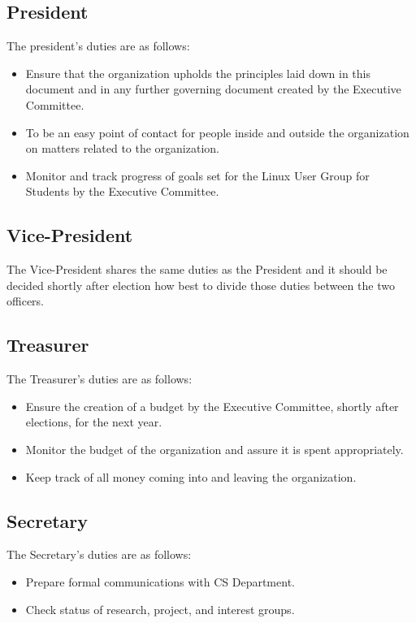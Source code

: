 \documentclass[letter]{report}
\begin{document}
\subsection{President}
The president's duties are as follows:
\begin{itemize}
	\item Ensure that the organization upholds the principles laid down in
	      this document and in any further governing document created by
	      the Executive Committee.
	\item To be an easy point of contact for people inside and outside the
	      organization on matters related to the organization.
	\item Monitor and track progress of goals set for the Linux User Group for Students
	      by the Executive Committee.
\end{itemize}

\subsection{Vice-President}
The Vice-President shares the same duties as the President and it should be
decided shortly after election how best to divide those duties between the two
officers.

\subsection{Treasurer}
The Treasurer's duties are as follows:
\begin{itemize}
	\item Ensure the creation of a budget by the Executive Committee,
	      shortly after elections, for the next year.
	\item Monitor the budget of the organization and assure it is spent
	      appropriately.
	\item Keep track of all money coming into and leaving the organization.
\end{itemize}

\subsection{Secretary}
The Secretary's duties are as follows:
\begin{itemize}
	\item Prepare formal communications with CS Department.
	\item Check status of research, project, and interest groups.
\end{itemize}
\end{document}
